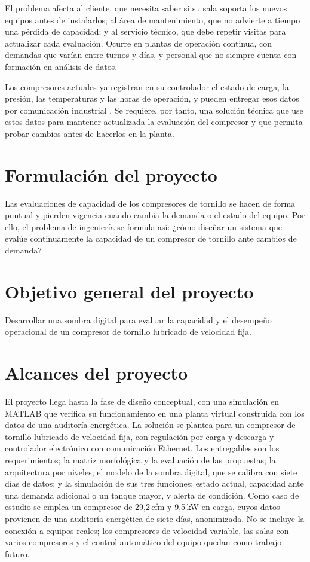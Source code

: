 El problema afecta al cliente, que necesita saber si su sala soporta los nuevos equipos antes de instalarlos; al área de mantenimiento, que no advierte a tiempo una pérdida de capacidad; y al servicio técnico, que debe repetir visitas para actualizar cada evaluación. Ocurre en plantas de operación continua, con demandas que varían entre turnos y días, y personal que no siempre cuenta con formación en análisis de datos.

Los compresores actuales ya registran en su controlador el estado de carga, la presión, las temperaturas y las horas de operación, y pueden entregar esos datos por comunicación industrial \cite{pinzaapolo2026}. Se requiere, por tanto, una solución técnica que use estos datos para mantener actualizada la evaluación del compresor y que permita probar cambios antes de hacerlos en la planta.

\section{Formulación del proyecto}

Las evaluaciones de capacidad de los compresores de tornillo se hacen de forma puntual y pierden vigencia cuando cambia la demanda o el estado del equipo. Por ello, el problema de ingeniería se formula así: ¿cómo diseñar un sistema que evalúe continuamente la capacidad de un compresor de tornillo ante cambios de demanda?

\section{Objetivo general del proyecto}

Desarrollar una sombra digital para evaluar la capacidad y el desempeño operacional de un compresor de tornillo lubricado de velocidad fija.

\section{Alcances del proyecto}

El proyecto llega hasta la fase de diseño conceptual, con una simulación en MATLAB que verifica su funcionamiento en una planta virtual construida con los datos de una auditoría energética. La solución se plantea para un compresor de tornillo lubricado de velocidad fija, con regulación por carga y descarga y controlador electrónico con comunicación Ethernet. Los entregables son los requerimientos; la matriz morfológica y la evaluación de las propuestas; la arquitectura por niveles; el modelo de la sombra digital, que se calibra con siete días de datos; y la simulación de sus tres funciones: estado actual, capacidad ante una demanda adicional o un tanque mayor, y alerta de condición. Como caso de estudio se emplea un compresor de 29,2\,cfm y 9,5\,kW en carga, cuyos datos provienen de una auditoría energética de siete días, anonimizada. No se incluye la conexión a equipos reales; los compresores de velocidad variable, las salas con varios compresores y el control automático del equipo quedan como trabajo futuro.
